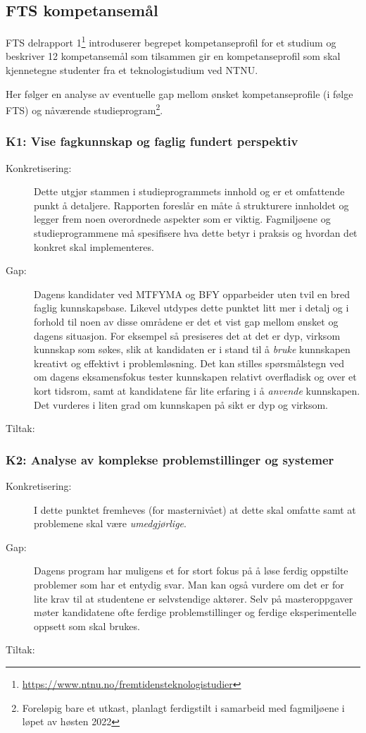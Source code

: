 \subsection{FTS kompetansemål}
\label{sec:fts-competencies}
FTS delrapport 1\footnote{\url{https://www.ntnu.no/fremtidensteknologistudier}} introduserer begrepet kompetanseprofil for et studium og beskriver 12 kompetansemål som tilsammen gir en kompetanseprofil som skal kjennetegne studenter fra et teknologistudium ved NTNU.

Her følger en analyse av eventuelle gap mellom ønsket kompetanseprofile (i følge FTS) og nåværende studieprogram\footnote{Foreløpig bare et utkast, planlagt ferdigstilt i samarbeid med fagmiljøene i løpet av høsten 2022}.

\subsubsection{K1: Vise fagkunnskap og faglig fundert perspektiv}
\begin{description}
\item[Konkretisering:] Dette utgjør stammen i studieprogrammets innhold og er et omfattende punkt å detaljere. Rapporten foreslår en måte å strukturere innholdet og legger frem noen overordnede aspekter som er viktig. Fagmiljøene og studieprogrammene må spesifisere hva dette betyr i praksis og hvordan det konkret skal implementeres.
\item[Gap:] Dagens kandidater ved MTFYMA og BFY opparbeider uten tvil en bred faglig kunnskapsbase. Likevel utdypes dette punktet litt mer i detalj og i forhold til noen av disse områdene er det et vist gap mellom ønsket og dagens situasjon. For eksempel så presiseres det at det er dyp, virksom kunnskap som søkes, slik at kandidaten er i stand til å \emph{bruke} kunnskapen kreativt og effektivt i problemløsning. Det kan stilles spørsmålstegn ved om dagens eksamensfokus tester kunnskapen relativt overfladisk og over et kort tidsrom, samt at kandidatene får lite erfaring i å \emph{anvende} kunnskapen. Det vurderes i liten grad om kunnskapen på sikt er dyp og virksom.
\item[Tiltak:] 
\end{description}

\subsubsection{K2: Analyse av komplekse problemstillinger og systemer}
\begin{description}
\item[Konkretisering:] I dette punktet fremheves (for masternivået) at dette skal omfatte  samt at problemene skal være \emph{umedgjørlige}. 
\item[Gap:] Dagens program har muligens et for stort fokus på å løse ferdig oppstilte problemer som har et entydig svar. Man kan også vurdere om det er for lite krav til at studentene er selvstendige aktører. Selv på masteroppgaver møter kandidatene ofte ferdige problemstillinger og ferdige eksperimentelle oppsett som skal brukes.
\item[Tiltak:] 
\end{description}

